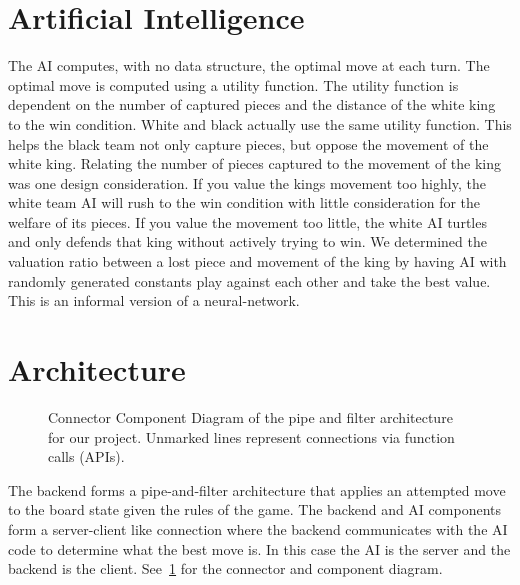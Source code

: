 \documentclass[11pt, oneside]{article}
\begin{document}
\section{Artificial Intelligence}
The AI computes, with no data structure, the optimal move at each turn.  The optimal move is computed using a utility function.  The utility function is dependent on the number of captured pieces and the distance of the white king to the win condition.  White and black actually use the same utility function.  This helps the black team not only capture pieces, but oppose the movement of the white king.  Relating the number of pieces captured to the movement of the king was one design consideration.  If you value the kings movement too highly, the white team AI will rush to the win condition with little consideration for the welfare of its pieces.  If you value the movement too little, the white AI turtles and only defends that king without actively trying to win.  We determined the valuation ratio between a lost piece and movement of the king by having AI with randomly generated constants play against each other and take the best value.  This is an informal version of a neural-network.

\section{Architecture}
\begin{figure}[H]\label{fig:CCD}
  \centering
  \caption{Connector Component Diagram of the pipe and filter architecture for
    our project. Unmarked lines represent connections via function calls
    (APIs).}
\end{figure}
The backend forms a pipe-and-filter architecture that applies an attempted move
to the board state given the rules of the game. The backend and AI components
form a server-client like connection where the backend communicates with the AI
code to determine what the best move is. In this case the AI is the server and
the backend is the client. See~\ref{fig:CCD} for the connector and component
diagram.
\end{document}
